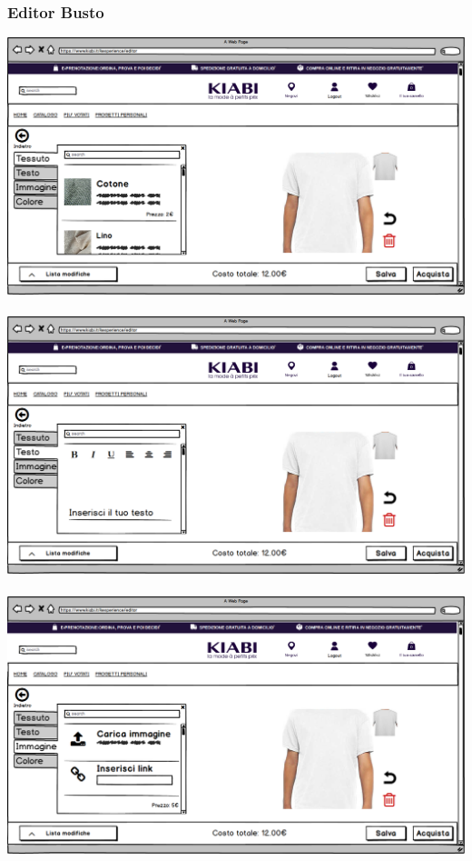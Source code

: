 \documentclass[12pt,italian,]{report}
\begin{document}
\subsubsection{Editor Busto} 
\includegraphics{balsamiq/Editor - caratteristica busto tessuto.png}
\\
\\
\includegraphics{balsamiq/Editor - caratteristica busto testo.png}
\\
\\
\includegraphics{balsamiq/Editor - caratteristica busto immagine.png}
\end{document}
